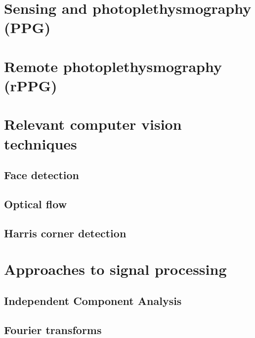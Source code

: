 
\section{Sensing and photoplethysmography (PPG)}
\section{Remote photoplethysmography (rPPG)}

\section{Relevant computer vision techniques}
\subsection{Face detection}
\subsection{Optical flow}
\subsection{Harris corner detection}
\section{Approaches to signal processing}
\subsection{Independent Component Analysis}
\subsection{Fourier transforms}


